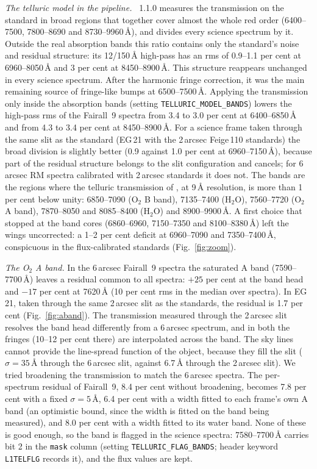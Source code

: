\textit{The telluric model in the pipeline.} \banzai{}~1.1.0 measures the transmission on the standard in broad
regions that together cover almost the whole red order (6400--7500, 7800--8690 and 8730--9960\,\AA), and divides
every science spectrum by it. Outside the real absorption bands this ratio contains only the standard's noise and
residual structure: its 12/150\,\AA{} high-pass has an rms of 0.9--1.1 per cent at 6960--8050\,\AA{} and 3 per cent
at 8450--8900\,\AA. This structure reappears unchanged in every science spectrum. After the harmonic fringe
correction, it was the main remaining source of fringe-like bumps at 6500--7500\,\AA. Applying the transmission only
inside the absorption bands (setting \texttt{TELLURIC\_MODEL\_BANDS}) lowers the high-pass rms of the Fairall~9
spectra from 3.4 to 3.0 per cent at 6400--6850\,\AA{} and from 4.3 to 3.4 per cent at 8450--8900\,\AA. For a science frame taken through the same slit as
the standard (EG\,21 with the 2\,arcsec Feige\,110 standards) the broad division is slightly better (0.9 against
1.0 per cent at 6960--7150\,\AA), because part of the residual structure belongs to the slit configuration and
cancels; for 6\,arcsec RM spectra calibrated with 2\,arcsec standards it does not.
The bands are the regions where the telluric transmission of \citet{Matheson2000}, at 9\,\AA{} resolution, is
more than 1 per cent below unity: 6850--7090 (O$_2$ B band), 7135--7400 (H$_2$O), 7560--7720 (O$_2$ A band), 7870--8050 and 8085--8400
(H$_2$O) and 8900--9900\,\AA. A first choice that stopped at the band cores (6860--6960, 7150--7350 and
8100--8380\,\AA) left the wings uncorrected: a 1--2 per cent deficit at 6960--7090 and 7350--7400\,\AA, conspicuous
in the flux-calibrated standards (Fig.~\ref{fig:zoom}).

\textit{The O$_2$ A band.} In the 6\,arcsec Fairall~9 spectra the saturated A band (7590--7700\,\AA) leaves a residual
common to all spectra: $+25$ per cent at the band head and $-17$ per cent at 7620\,\AA{} (10 per cent rms in the median
over spectra). In EG\,21, taken through the same 2\,arcsec slit as the standards, the residual is 1.7 per cent
(Fig.~\ref{fig:aband}). The transmission measured through the 2\,arcsec slit resolves the band head differently from
a 6\,arcsec spectrum, and in both the fringes (10--12 per cent there) are interpolated across the band. The sky lines
cannot provide the line-spread function of the object, because they fill the slit ($\sigma=35$\,\AA{} through the
6\,arcsec slit, against 6.7\,\AA{} through the 2\,arcsec slit). We tried broadening the transmission to match the
6\,arcsec spectra. The per-spectrum residual of Fairall~9, 8.4 per cent without broadening, becomes 7.8 per cent with a
fixed $\sigma=5$\,\AA, 6.4 per cent with a width fitted to each frame's own A band (an optimistic bound, since the
width is fitted on the band being measured), and 8.0 per cent with a width fitted to its water band. None of these is
good enough, so the band is flagged in the science spectra: 7580--7700\,\AA{} carries bit 2 in the \texttt{mask}
column (setting \texttt{TELLURIC\_FLAG\_BANDS}; header keyword \texttt{L1TELFLG} records it), and the flux values
are kept.

